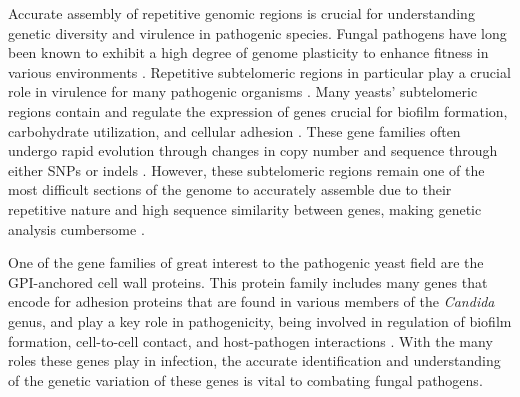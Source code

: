 Accurate assembly of repetitive genomic regions is crucial for understanding genetic diversity and virulence in pathogenic species. Fungal pathogens have long been known to exhibit a high degree of genome plasticity to enhance fitness in various environments \citep{Croll2013-mm, Ford2015-qs, Lopez-Fuentes2018-zt, Carrete2019-xo, Todd2019-sy}. Repetitive subtelomeric regions in particular play a crucial role in virulence for many pathogenic organisms \citep{Barry2003-ln, De_Las_Penas2003-zd}. Many yeasts’ subtelomeric regions contain and regulate the expression of genes crucial for biofilm formation, carbohydrate utilization, and cellular adhesion \citep{Naumov1995-ju,  De_Las_Penas2003-zd, Iraqui2005-hy}. These gene families often undergo rapid evolution through changes in copy number and sequence through either SNPs or indels \citep{Carreto2008-pz, Brown2010-az, Anderson2015-fa}. However, these subtelomeric regions remain one of the most difficult sections of the genome to accurately assemble due to their repetitive nature and high sequence similarity between genes, making genetic analysis cumbersome \citep{Brown2010-az}.

One of the gene families of great interest to the pathogenic yeast field are the GPI-anchored cell wall proteins. This protein family includes many genes that encode for adhesion proteins that are found in various members of the \textit{Candida} genus, and play a key role in pathogenicity, being involved in regulation of biofilm formation, cell-to-cell contact, and host-pathogen interactions \citep{Timmermans2018-ci, McCall2019-zn}. With the many roles these genes play in infection, the accurate identification and understanding of the genetic variation of these genes is vital to combating fungal pathogens.


